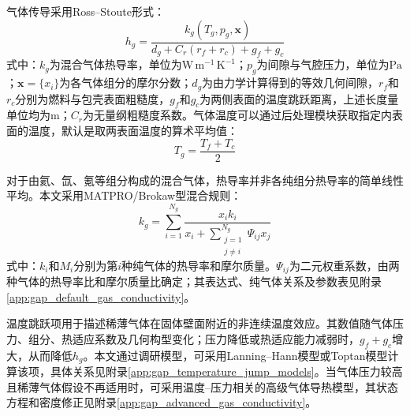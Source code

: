 
气体传导采用Ross--Stoute形式\cite{rossHEATTRANSFERCOEFFICIENT1962,halesBISONTheoryManual2016}：
\begin{equation}
	h_g
	=\frac{k_g\!\left(T_g,p_g,\boldsymbol{x}\right)}
	{d_g+C_r\left(r_f+r_c\right)+g_f+g_c}
	\label{eq:gap_gas_conductance}
\end{equation}
式中：$k_g$为混合气体热导率，单位为$\mathrm{W\,m^{-1}\,K^{-1}}$；$p_g$为间隙与气腔压力，单位为$\mathrm{Pa}$；$\boldsymbol{x}=\{x_i\}$为各气体组分的摩尔分数；$d_g$为由力学计算得到的等效几何间隙，$r_f$和$r_c$分别为燃料与包壳表面粗糙度，$g_f$和$g_c$为两侧表面的温度跳跃距离，上述长度量单位均为$\mathrm{m}$；$C_r$为无量纲粗糙度系数。气体温度可以通过后处理模块获取指定内表面的温度，默认是取两表面温度的算术平均值：
\begin{equation}
	T_g=\frac{T_f+T_c}{2}
	\label{eq:gap_gas_temperature}
\end{equation}

对于由氦、氙、氪等组分构成的混合气体，热导率并非各纯组分热导率的简单线性平均。本文采用MATPRO/Brokaw型混合规则\cite{hagrmanSCDAPRELAP5MOD1995,brokawApproximateFormulasViscosity1958}：
\begin{equation}
	k_g
	=\sum_{i=1}^{N_g}
	\frac{x_i k_i}
	{x_i+\displaystyle\sum_{\substack{j=1\\j\ne i}}^{N_g}
		\Psi_{ij}x_j}
	\label{eq:gap_gas_mixture_conductivity}
\end{equation}
式中：$k_i$和$M_i$分别为第$i$种纯气体的热导率和摩尔质量。$\Psi_{ij}$为二元权重系数，由两种气体的热导率比和摩尔质量比确定；其表达式、纯气体关系及参数表见附录\ref{app:gap_default_gas_conductivity}。

温度跳跃项用于描述稀薄气体在固体壁面附近的非连续温度效应。其数值随气体压力、组分、热适应系数及几何构型变化；压力降低或热适应能力减弱时，$g_f+g_c$增大，从而降低$h_g$。本文通过调研模型，可采用Lanning--Hann模型或Toptan模型计算该项\cite{lanningReviewMethodsApplicable1975,toptanGapConductanceModeling2019,toptanModelingGapConductance2020}，具体关系见附录\ref{app:gap_temperature_jump_models}。当气体压力较高且稀薄气体假设不再适用时，可采用温度--压力相关的高级气体导热模型，其状态方程和密度修正见附录\ref{app:gap_advanced_gas_conductivity}。


